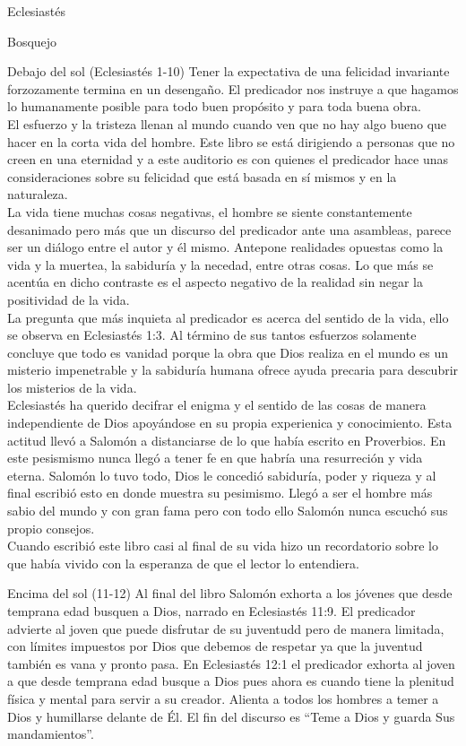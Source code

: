 \begin{section}{Eclesiastés}
\begin{subsection}{Bosquejo}
\begin{subsubsection}{Debajo del sol (Eclesiastés 1-10)}
			 Tener la expectativa de una felicidad invariante forzozamente termina en un desengaño. El predicador nos instruye a que hagamos lo humanamente posible para todo buen propósito y para toda buena obra.\\
			 El esfuerzo y la tristeza llenan al mundo cuando ven que no hay algo bueno que hacer en la corta vida del hombre. Este libro se está dirigiendo a personas que no creen en una eternidad y a este auditorio es con quienes el predicador hace unas consideraciones sobre su felicidad que está basada en sí mismos y en la naturaleza.\\
			 La vida tiene muchas cosas negativas, el hombre se siente constantemente desanimado pero más que un discurso del predicador ante una asambleas, parece ser un diálogo entre el autor y él mismo. Antepone realidades opuestas como la vida y la muertea, la sabiduría y la necedad, entre otras cosas. Lo que más se acentúa en dicho contraste es el aspecto negativo de la realidad sin negar la positividad de la vida.\\
			 La pregunta que más inquieta al predicador es acerca del sentido de la vida, ello se observa en Eclesiastés 1:3. Al término de sus tantos esfuerzos solamente concluye que todo es vanidad porque la obra que Dios realiza en el mundo es un misterio impenetrable y la sabiduría humana ofrece ayuda precaria para descubrir los misterios de la vida.\\
			 Eclesiastés ha querido decifrar el enigma y el sentido de las cosas de manera independiente de Dios apoyándose en su propia experienica y conocimiento. Esta actitud llevó a Salomón a distanciarse de lo que había escrito en Proverbios. En este pesismismo nunca llegó a tener fe en que habría una resurreción y vida eterna. Salomón lo tuvo todo, Dios le concedió sabiduría, poder y riqueza y al final escribió esto en donde muestra su pesimismo. Llegó a ser el hombre más sabio del mundo y con gran fama pero con todo ello Salomón nunca escuchó sus propio consejos.\\
			 Cuando escribió este libro casi al final de su vida hizo un recordatorio sobre lo que había vivido con la esperanza de que el lector lo entendiera. 
	\end{subsubsection}
	\newpage
	\begin{subsubsection}{Encima del sol (11-12)}
		Al final del libro Salomón exhorta a los jóvenes que desde temprana edad busquen a Dios, narrado en Eclesiastés 11:9. El predicador advierte al joven que puede disfrutar de su juventudd pero de manera limitada, con límites impuestos por Dios que debemos de respetar ya que la juventud también es vana y pronto pasa. En Eclesiastés 12:1 el predicador exhorta al joven a que desde temprana edad busque a Dios pues ahora es cuando tiene la plenitud física y mental para servir a su creador. Alienta a todos los hombres a temer a Dios y humillarse delante de Él. El fin del discurso es ``Teme a Dios y guarda Sus mandamientos''.\\

\end{subsubsection}
\end{subsection}
\end{section}
